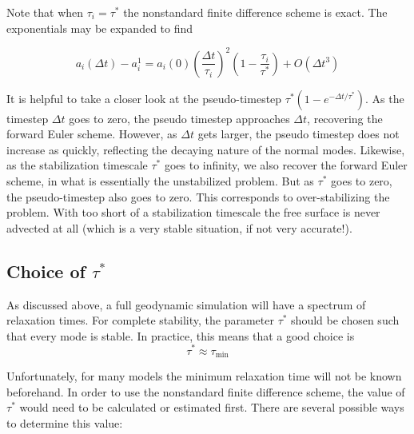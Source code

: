 \documentclass[preprint,12pt,authoryear]{elsarticle}
\newif\ifdetail
\begin{document}
Note that when $\tau_i = \tau^*$ the nonstandard finite difference scheme is exact.
The exponentials may be expanded to find
\ifdetail
\begin{equation}
a_i(\Delta t) - a_i^{1} = - a_i{(0)} \left[ \left(\frac{\Delta t}{\tau_i}\right)^2 - \frac{\tau^*}{\tau_i} \left(\frac{\Delta t }{\tau^* }\right)^2 \right] 
\end{equation}
\fi
\begin{equation}
a_i(\Delta t) - a_i^{1} = {a_i{(0)} } \left( \frac{\Delta t}{\tau_i} \right)^2 \left( 1 - \frac{\tau_i}{\tau^*} \right) + O(\Delta t^3)
\end{equation}

It is helpful to take a closer look at the pseudo-timestep $\tau^*(1-e^{-\Delta t/\tau^*})$.
As the timestep $\Delta t$ goes to zero, the pseudo timestep approaches $\Delta t$, recovering 
the forward Euler scheme. However, as $\Delta t$ gets larger, the pseudo timestep does not 
increase as quickly, reflecting the decaying nature of the normal modes.
Likewise, as the stabilization timescale $\tau^*$ goes to infinity, we also recover the 
forward Euler scheme, in what is essentially the unstabilized problem. But as $\tau^*$
goes to zero, the pseudo-timestep also goes to zero. This corresponds to over-stabilizing the
problem. With too short of a stabilization timescale the free surface is never advected 
at all (which is a very stable situation, if not very accurate!).

\subsection{Choice of $\tau^*$}
As discussed above, a full geodynamic simulation will have a spectrum of relaxation times.
For complete stability, the parameter $\tau^*$ should be chosen such that every mode is stable.
In practice, this means that a good choice is 
\begin{equation}
\tau^* \approx \tau_{\mathrm{min}}
\label{eq:tau_choice}
\end{equation}

Unfortunately, for many models the minimum relaxation time will not be known beforehand. 
In order to use the nonstandard finite difference scheme, the value of $\tau^*$ would need 
to be calculated or estimated first.  There are several possible ways to determine this value:
\end{document}
